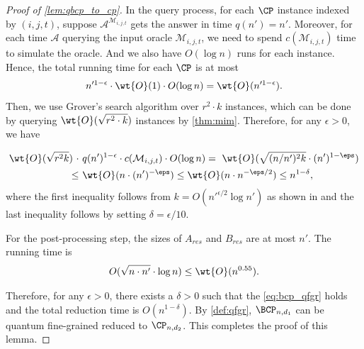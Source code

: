 \begin{proof}[Proof of \cref{lem:qbcp_to_cp}]
In the query process, for each $\CP$ instance indexed by $(i,j,t)$, suppose $\mathcal{A}^{\mathcal{M}_{i,j,t}}$ gets the answer in time $q(n')=n'$. Moreover, for each time $\mathcal{A}$ querying the input oracle $\mathcal{M}_{i,j,t}$, we need to spend $c(\mathcal{M}_{i,j,t})$ time to simulate the oracle. And we also have $O(\log n)$ runs for each instance. Hence, the total running time for each $\CP$ is at most  
\begin{align}
    n'^{1-\epsilon}\cdot \wt{O}(1)\cdot O(\log n)=\wt{O}(n'^{1-\epsilon}).
\end{align}
Then, we use Grover's search algorithm over $r^2\cdot k$ instances, which can be done by querying $\wt{O}(\sqrt{r^2\cdot k})$ instances by \cref{thm:mim}. Therefore, for any $\epsilon > 0$, we have

\begin{align}\label{eq:bcp_qfgr}
    \wt{O}(\sqrt{r^2 k})~\cdot &~ q(n')^{1-\epsilon}\cdot c(\mathcal{M}_{i,j,t})\cdot O(\log n) =  ~ 
    \wt{O}(\sqrt{(n/n')^2 k}\cdot(n')^{1-\eps}) \\
    \leq &~ \wt{O}(n\cdot (n')^{-\eps})
    \leq \wt{O}(n\cdot n^{-\eps/2})
    \leq n^{1-\delta},
\end{align}
where the first inequality follows from $k=O(n'^{\epsilon / 2}\log n')$ as shown in \cite{r29} and the last inequality follows by setting $\delta = \epsilon / 10$.

For the post-processing step, the sizes of $A_{res}$ and $B_{res}$ are at most $n'$. The running time is 
\begin{align}
    O(\sqrt{n\cdot n'}\cdot \log n) \leq \wt{O}(n^{0.55}).
\end{align}

Therefore, for any $\epsilon>0$, there exists a $\delta>0$ such that the \cref{eq:bcp_qfgr} holds and the total reduction time is $O(n^{1-\delta})$. By \cref{def:qfgr}, $\BCP_{n,d_1}$ can be quantum fine-grained reduced to $\CP_{n,d_2}$. This completes the proof of this lemma. 
\end{proof}


